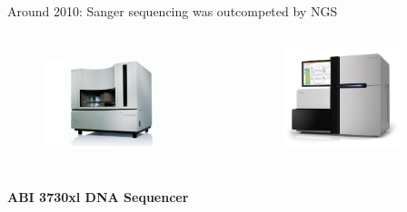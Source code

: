 \documentclass[10pt]{beamer}
\begin{document}
\begin{frame}{Around 2010: Sanger sequencing was outcompeted by NGS}
	\begin{columns}[T,onlytextwidth]
		\begin{figure}
			\includegraphics[width=0.8\textwidth]{./figures/abi3730xl.jpg} \vspace{1em} \\
		\end{figure}
		\begin{figure}
			\includegraphics[width=0.8\textwidth]{./figures/system-carousel-hiseq2500-left.png}
		\end{figure}
	\end{columns}
	\begin{columns}[T,onlytextwidth]
		\begin{exampleblock}{}
			\textbf{ABI 3730xl DNA Sequencer}\\

\end{exampleblock}
\end{columns}
\end{frame}
\end{document}
